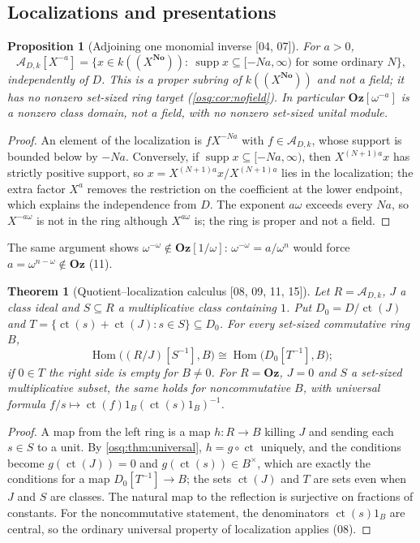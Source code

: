 \documentclass[11pt,letterpaper]{article}
\numberwithin{equation}{section}
\newtheorem{theorem}{Theorem}[section]
\newtheorem{proposition}[proposition]{Proposition}
\theoremstyle{definition}
\theoremstyle{remark}
\theoremstyle{plain}
\newcommand{\No}{\mathbf{No}}
\newcommand{\Oz}{\mathbf{Oz}}
\newcommand{\A}{\mathcal A}          %
\newcommand{\hahn}[2]{#1(\!(X^{#2})\!)}
\newcommand{\ct}{\operatorname{ct}}
\newcommand{\supp}{\operatorname{supp}}
\newcommand{\Hom}{\operatorname{Hom}}
\newcommand{\src}[1]{\textup{\textsf{[#1]}}}
\begin{document}
\subsection{Localizations and presentations}\label{osq:sub:localization}

\begin{proposition}[Adjoining one monomial inverse \src{04, 07}]\label{osq:prop:locsupport}
For $a>0$,
\[
 \A_{D,k}[X^{-a}]=\{x\in\hahn k\No:\ \supp x\subseteq[-Na,\infty)\text{ for some ordinary }N\},
\]
independently of $D$. This is a proper subring of $\hahn k\No$ and not a field; it has no
nonzero set-sized ring target (\cref{osq:cor:nofield}). In particular
$\Oz[\omega^{-a}]$ is a nonzero class domain, not a field, with no nonzero set-sized unital
module.
\end{proposition}
\begin{proof}
An element of the localization is $fX^{-Na}$ with $f\in\A_{D,k}$, whose support is bounded
below by $-Na$. Conversely, if $\supp x\subseteq[-Na,\infty)$, then $X^{(N+1)a}x$ has strictly
positive support, so $x=X^{(N+1)a}x/X^{(N+1)a}$ lies in the localization; the extra factor
$X^a$ removes the restriction on the coefficient at the lower endpoint, which explains the
independence from $D$. The exponent $a\omega$ exceeds every $Na$, so $X^{-a\omega}$ is not in
the ring although $X^{a\omega}$ is; the ring is proper and not a field.
\end{proof}

The same argument shows $\omega^{-\omega}\notin\Oz[1/\omega]$: $\omega^{-\omega}=a/\omega^n$
would force $a=\omega^{n-\omega}\notin\Oz$ (11).

\begin{theorem}[Quotient--localization calculus \src{08, 09, 11, 15}]\label{osq:thm:localization}
Let $R=\A_{D,k}$, $J$ a class ideal and $S\subseteq R$ a multiplicative class containing $1$.
Put $D_0=D/\ct(J)$ and $T=\{\ct(s)+\ct(J):s\in S\}\subseteq D_0$. For every set-sized
commutative ring $B$,
\[
 \Hom\bigl((R/J)[S^{-1}],B\bigr)\cong\Hom\bigl(D_0[T^{-1}],B\bigr);
\]
if $0\in T$ the right side is empty for $B\ne0$. For $R=\Oz$, $J=0$ and $S$ a set-sized
multiplicative subset, the same holds for noncommutative $B$, with universal formula
$f/s\mapsto\ct(f)1_B(\ct(s)1_B)^{-1}$.
\end{theorem}
\begin{proof}
A map from the left ring is a map $h:R\to B$ killing $J$ and sending each $s\in S$ to a unit.
By \cref{osq:thm:universal}, $h=g\circ\ct$ uniquely, and the conditions become
$g(\ct(J))=0$ and $g(\ct(s))\in B^\times$, which are exactly the conditions for a map
$D_0[T^{-1}]\to B$; the sets $\ct(J)$ and $T$ are sets even when $J$ and $S$ are classes.
The natural map to the reflection is surjective on fractions of constants. For the
noncommutative statement, the denominators $\ct(s)1_B$ are central, so the ordinary
universal property of localization applies (08).
\end{proof}
\end{document}

